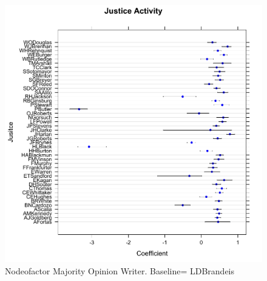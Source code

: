 \documentclass[headsepline=true, abstracton]{scrartcl}
\begin{document}
 \begin{figure}[H]
\includegraphics[width=15cm]{justice_activity}
\caption{Nodeofactor Majority Opinion Writer. Baseline= LDBrandeis }
 \label{number_supporting}
\vspace{-.25cm}
\end{figure} 
\end{document}
